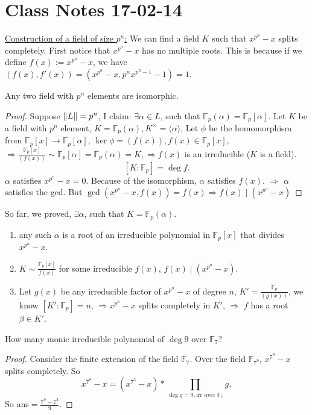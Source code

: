 \section{Class Notes 17-02-14}
\underline{Construction of a field of size $p^n$:}
We can find a field $K$ such that $x^{p^n}-x$ splits completely. First notice that $x^{p^n}-x$ has no multiple roots. This is because if we define $f(x):=x^{p^n}-x$, we have $(f(x), f'(x)) = (x^{p^n}-x, p^nx^{p^n-1}-1) = 1$.
\begin{theorem}
Any two field with $p^n$ elements are isomorphic.
\end{theorem}
\begin{proof}
Suppose $\|L\| = p^n$, I claim: $\exists\alpha\in L$, such that $\mathbb{F}_p(\alpha)=\mathbb{F}_p[\alpha]$. Let $K$ be a field with $p^n$ element, $K=\mathbb{F}_p(\alpha), K^{\times}=\langle\alpha\rangle
$, Let $\phi$ be the homomorphism from $\mathbb{F}_p[x]\rightarrow \mathbb{F}_p[\alpha]$, $\ker{\phi}=(f(x)), f(x)\in \mathbb{F}_p[x]$, $\Rightarrow \frac{\mathbb{F}_p[x]}{(f(x))}\sim \mathbb{F}_p[\alpha]=\mathbb{F}_p(\alpha)=K,\Rightarrow f(x)$ is an irreducible ($K$ is a field).$$[K:\mathbb{F}_p]=\deg{f}.$$ $\alpha$ satisfies $x^{p^n}-x=0$. Because of the isomorphism, $\alpha$ satisfies $f(x)$. $\Rightarrow$ $\alpha$ satisfies the gcd. But $\gcd(x^{p^n}-x, f(x)) =f(x)\Rightarrow f(x)\mid (x^{p^n}-x)$
\end{proof} 
So far, we proved, $\exists\alpha$, such that $K=\mathbb{F}_p(\alpha)$.
\begin{enumerate}
	\item any such $\alpha$ is a root of an irreducible polynomial in $\mathbb{F}_p[x]$ that divides $x^{p^n}-x$.
	\item $K\sim \frac{\mathbb{F}_p[x]}{f(x)}$ for some irreducible $f(x)$, $f(x)\mid (x^{p^n}-x)$.
	\item Let $g(x)$ be any irreducible factor of $x^{p^n}-x$ of degree $n$, $K' = \frac{\mathbb{F}_p}{(g(x))}$, we know $[K': \mathbb{F}_p]=n$, $\Rightarrow x^{p^n}-x$ splits completely in $K'$, $\Rightarrow$ $f$ has a root $\beta\in K'$.
\end{enumerate}
\begin{exercise}
How many monic irreducible polynomial of $\deg 9$ over $\mathbb{F}_7$? 
\end{exercise}
\begin{proof}
Consider the finite extension of the field $\mathbb{F}_7$. Over the field $\mathbb{F}_{7^9}$, $x^{7^9}-x$ splits completely. So$$ x^{7^9}-x=(x^{7^3}-x)* \prod_{\deg{g}=9, \mbox{irr over }\mathbb{F}_7} g,$$ So ans$=\frac{7^9-7^3}{9}$.
\end{proof}
